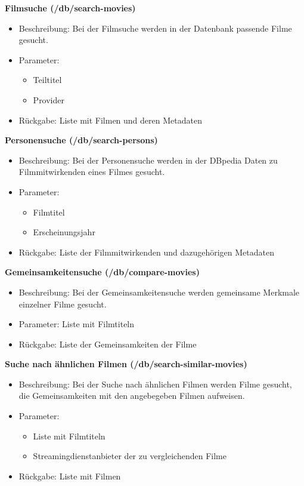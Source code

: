 \documentclass[conference]{IEEEtran}
\begin{document}
\textbf{Filmsuche (/db/search-movies)}
\begin{itemize}
\item Beschreibung:
    Bei der Filmsuche werden in der Datenbank passende Filme gesucht.
\item Parameter:
\begin{itemize}
    \item Teiltitel
    \item Provider
\end{itemize}
\item Rückgabe:
    Liste mit Filmen und deren Metadaten
\end{itemize}

\smallskip

\textbf{Personensuche (/db/search-persons)}
\begin{itemize}
\item Beschreibung:
    Bei der Personensuche werden in der DBpedia Daten zu Filmmitwirkenden eines Filmes gesucht.
\item Parameter:
    \begin{itemize}
    \item Filmtitel
    \item Erscheinungsjahr
    \end{itemize}
\item Rückgabe:
    Liste der Filmmitwirkenden und dazugehörigen Metadaten
\end{itemize}

\smallskip

\textbf{Gemeinsamkeitensuche (/db/compare-movies)}
\begin{itemize}
\item Beschreibung:
    Bei der Gemeinsamkeitensuche werden gemeinsame Merkmale einzelner Filme gesucht.
\item Parameter:
    Liste mit Filmtiteln
\item Rückgabe:
    Liste der Gemeinsamkeiten der Filme
\end{itemize}

\smallskip

\textbf{Suche nach ähnlichen Filmen (/db/search-similar-movies)}
\begin{itemize}
\item Beschreibung:
    Bei der Suche nach ähnlichen Filmen werden Filme gesucht, die Gemeinsamkeiten mit den angebegeben Filmen aufweisen.
\item Parameter:
    \begin{itemize}
    \item Liste mit Filmtiteln
    \item Streamingdienstanbieter der zu vergleichenden Filme
    \end{itemize}
\item Rückgabe:
    Liste mit Filmen
\end{itemize}
\end{document}
